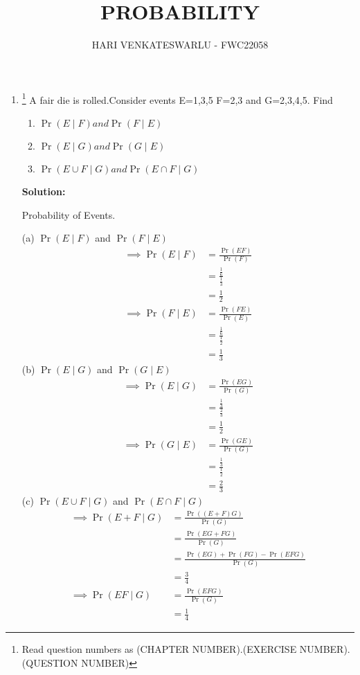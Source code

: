 \documentclass{article}
\providecommand{\pr}[1]{\ensuremath{\Pr\left(#1\right)}}
\newcommand{\solution}{\noindent \textbf{Solution: }}
\providecommand{\pr}[1]{\ensuremath{\Pr\left(#1\right)}}
\begin{document}
\title{PROBABILITY}
\author{\Large HARI VENKATESWARLU - FWC22058}
\date{}

\maketitle

\begin{enumerate}[label=13.\arabic{enumi}.\arabic{enumii}]%
\setcounter{enumi}{0}
\setcounter{enumii}{11}

\item \footnote{Read question numbers as (CHAPTER NUMBER).(EXERCISE NUMBER).(QUESTION NUMBER)} {A fair die is rolled.Consider events E=1,3,5 F=2,3 and G=2,3,4,5. Find}
\begin{enumerate}
\item $\pr{E \mid F} and \pr{F \mid E}$
\item $\pr{E \mid G} and \pr{G \mid E}$
\item $\pr{{E \cup F} \mid G} and \pr{{E \cap F} \mid G}$
\end{enumerate}
	\solution\\
	\begin{table}[h]\centering
	
	\caption{Probability of Events.}
	\label{table1:}
\end{table}

(a) $\pr{E \mid F}$ and $\pr{F \mid E}$
\begin{align}
\implies\pr{E \mid F} &= \frac{\pr{EF}}{\pr{F}}\\
&=\frac{\frac{1}{6}}{\frac{1}{3}}\\
&=\frac{1}{2}\\
\implies\pr{F \mid E} &= \frac{\pr{FE}}{\pr{E}}\\
&= \frac{\frac{1}{6}}{\frac{1}{2}}\\
&=\frac{1}{3}
\end{align}
(b) $\pr{E \mid G}$ and $\pr{G \mid E}$
\begin{align}
\implies\pr{E \mid G} &= \frac{\pr{EG}}{\pr{G}}\\
&=\frac{\frac{1}{3}}{\frac{2}{3}}\\
&=\frac{1}{2}\\
\implies \pr{G \mid E} &= \frac{\pr{GE}}{\pr{G}}\\
&=\frac{\frac{1}{3}}{\frac{1}{2}}\\
&=\frac{2}{3}
\end{align}
(c) $\pr{{E \cup F} \mid G}$ and $\pr{{E \cap F} \mid G}$
\begin{align}
\implies \pr{{E+F} \mid G} &= \frac{\pr{{(E+F)}G}}{\pr{G}}\\
&=\frac{\pr{{EG+F}G}}{\pr{G}}\\
&=\frac{\pr{EG}+\pr{FG}-\pr{EFG}}{\pr{G}}\\
&=\frac{3}{4}\\
\implies \pr{{EF} \mid G} &= \frac{\pr{EFG}}{\pr{G}}\\
&=\frac{1}{4}
\end{align}
\end{enumerate}
\end{document}
